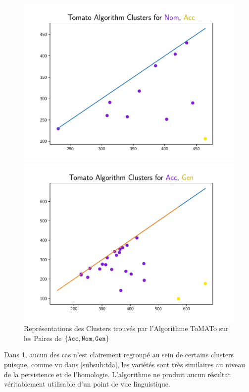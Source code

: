 \documentclass{cours}
\begin{document}
\begin{figure}
\begin{minipage}{.5\textwidth}
	\includegraphics[width=\linewidth]{Figures/Visualisations/tomato_Nom_Acc_Nouns}
\end{minipage}
\begin{minipage}{.5\textwidth}
	\includegraphics[width=\linewidth]{Figures/Visualisations/tomato_Acc_Gen_Nouns}
\end{minipage}
\caption{Représentations des Clusters trouvés par l'Algorithme ToMATo sur les Paires de $\{\tt Acc,Nom,Gen\}$}
\label{fig_tomato}
\end{figure}

Dans \ref{fig_tomato}, aucun des cas n'est clairement regroupé au sein de certains clusters puisque, comme vu dans \ref{subsub:tda}, les variétés sont très similaires au niveau de la persistence et de l'homologie. L'algorithme ne produit aucun résultat véritablement utilisable d'un point de vue linguistique.
\end{document}
